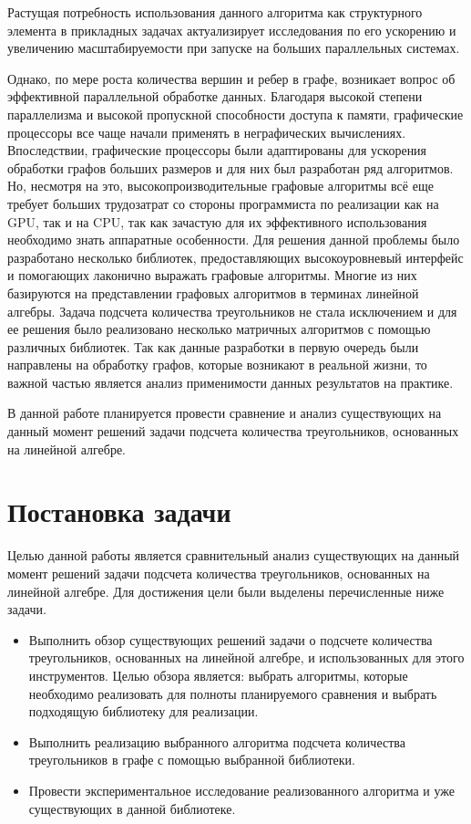 \documentclass[14pt]{matmex-diploma}
\begin{document}
Растущая потребность использования данного алгоритма как структурного элемента в прикладных задачах актуализирует исследования по его ускорению и увеличению масштабируемости при запуске на больших параллельных системах.

Однако, по мере роста количества вершин и ребер в графе, возникает вопрос об эффективной параллельной обработке данных. Благодаря высокой степени параллелизма и высокой пропускной способности доступа к памяти, графические процессоры все чаще начали применять в неграфических вычислениях. Впоследствии, графические процессоры были адаптированы для ускорения обработки графов больших размеров и для них был разработан ряд алгоритмов. Но, несмотря на это, высокопроизводительные графовые алгоритмы всё еще требует больших трудозатрат со стороны программиста по реализации как на GPU, так и на CPU, так как зачастую для их эффективного использования необходимо знать аппаратные особенности. Для решения данной проблемы было разработано несколько библиотек, предоставляющих высокоуровневый интерфейс и помогающих лаконично выражать графовые алгоритмы. Многие из них базируются на представлении графовых алгоритмов в терминах линейной алгебры. Задача подсчета количества треугольников не стала исключением и для ее решения было реализовано несколько матричных алгоритмов с помощью различных библиотек. Так как данные разработки в первую очередь были направлены на обработку графов, которые возникают в реальной жизни, то важной частью является анализ применимости данных результатов на практике.

В данной работе планируется провести сравнение и анализ существующих на данный момент решений задачи подсчета количества треугольников, основанных на линейной алгебре.

\section{Постановка задачи}
Целью данной работы является сравнительный анализ существующих на данный момент решений задачи подсчета количества треугольников, основанных на линейной алгебре.
Для достижения цели были выделены перечисленные ниже задачи.
\begin{itemize}
    \item Выполнить обзор существующих решений задачи о подсчете количества треугольников, основанных на линейной алгебре, и использованных для этого инструментов. Целью обзора является: выбрать алгоритмы, которые необходимо реализовать для полноты планируемого сравнения и выбрать подходящую библиотеку для реализации.
    \item Выполнить реализацию выбранного алгоритма подсчета количества треугольников в графе с помощью выбранной библиотеки.
    \item Провести экспериментальное исследование реализованного алгоритма и уже существующих в данной библиотеке.
\end{itemize}
\end{document}
